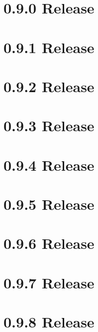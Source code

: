 \let\mypdfximage\pdfximage\def\pdfximage{\immediate\mypdfximage}\documentclass[twoside]{book}
\newcommand{\+}{\discretionary{\mbox{\scriptsize$\hookleftarrow$}}{}{}}
\begin{document}
\chapter{0.9.0 Release}
\label{doc_news_2019-08-06_0_9_0_md}

\chapter{0.9.1 Release}
\label{doc_news_2019-11-26_0_9_1_md}

\chapter{0.9.2 Release}
\label{doc_news_2020-05-26_0_9_2_md}

\chapter{0.9.3 Release}
\label{doc_news_2020-10-30_0_9_3_md}

\chapter{0.9.4 Release}
\label{doc_news_2021-02-01_0_9_4_md}

\chapter{0.9.5 Release}
\label{doc_news_2021-04-12_0_9_5_md}

\chapter{0.9.6 Release}
\label{doc_news_2021-06-07_0_9_6_md}

\chapter{0.9.7 Release}
\label{doc_news_2021-07-09_0_9_7_md}

\chapter{0.9.8 Release}
\label{doc_news_2021-10-04_0_9_8_md}

\end{document}
